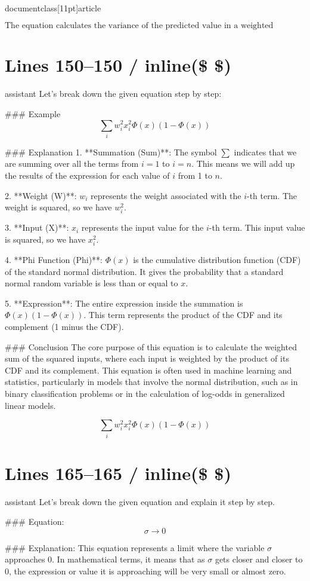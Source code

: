 \\documentclass[11pt]{article}
\begin{document}
\[
\boxed{\text{The equation calculates the variance of the predicted value in a weighted regression model.}}
\]


\section*{Lines 150–150 / inline(\$ \$) }
assistant
Let's break down the given equation step by step:

### Example
\[
\sum_i w_i^2 x_i^2 \Phi(x) (1 - \Phi(x))
\]

### Explanation
1. **Summation (Sum)**: The symbol \(\sum\) indicates that we are summing over all the terms from \(i = 1\) to \(i = n\). This means we will add up the results of the expression for each value of \(i\) from 1 to \(n\).

2. **Weight (W)**: \(w_i\) represents the weight associated with the \(i\)-th term. The weight is squared, so we have \(w_i^2\).

3. **Input (X)**: \(x_i\) represents the input value for the \(i\)-th term. This input value is squared, so we have \(x_i^2\).

4. **Phi Function (Phi)**: \(\Phi(x)\) is the cumulative distribution function (CDF) of the standard normal distribution. It gives the probability that a standard normal random variable is less than or equal to \(x\).

5. **Expression**: The entire expression inside the summation is \(\Phi(x) (1 - \Phi(x))\). This term represents the product of the CDF and its complement (1 minus the CDF).

### Conclusion
The core purpose of this equation is to calculate the weighted sum of the squared inputs, where each input is weighted by the product of its CDF and its complement. This equation is often used in machine learning and statistics, particularly in models that involve the normal distribution, such as in binary classification problems or in the calculation of log-odds in generalized linear models.

\[
\boxed{\sum_i w_i^2 x_i^2 \Phi(x) (1 - \Phi(x))}
\]


\section*{Lines 165–165 / inline(\$ \$) }
assistant
Let's break down the given equation and explain it step by step.

### Equation:
\[
\sigma \to 0
\]

### Explanation:
This equation represents a limit where the variable \(\sigma\) approaches 0. In mathematical terms, it means that as \(\sigma\) gets closer and closer to 0, the expression or value it is approaching will be very small or almost zero.
\end{document}
